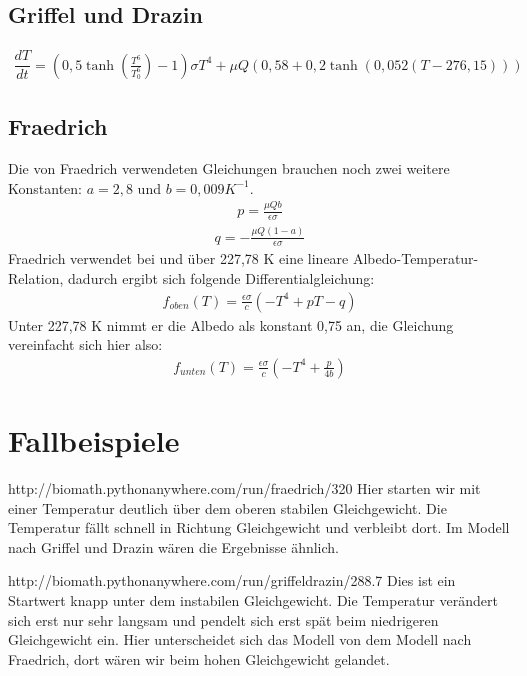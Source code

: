\documentclass[]{report}
\begin{document}
\section{Griffel und Drazin}
	\begin{align}
		\dfrac{dT}{dt} = (0,5 \tanh\left(\frac{T^6}{T_0^6}\right)-1) \sigma T^4 + \mu Q (0,58 + 0,2 \tanh (0,052 (T - 276,15)))
	\end{align}
\section{Fraedrich}

Die von Fraedrich verwendeten Gleichungen brauchen noch zwei weitere Konstanten: $a=2,8$ und $b=0,009 K^{-1}$.
	\begin{align}
		p=\frac{\mu Q b}{\epsilon \sigma}
	\end{align}
	\begin{align}
		q = - \frac{\mu Q (1-a)}{\epsilon \sigma}
	\end{align}
	Fraedrich verwendet bei und über 227,78 K eine lineare Albedo-Temperatur-Relation, dadurch ergibt sich folgende Differentialgleichung:
	\begin{align}
		f_{oben}(T) = \frac{\epsilon \sigma}{c} (-T^4 + p T - q)
	\end{align}
	Unter 227,78 K nimmt er die Albedo als konstant 0,75 an, die Gleichung vereinfacht sich hier also:
	\begin{align}
		f_{unten}(T) = \frac{\epsilon \sigma}{c} (-T^4 + \frac{p}{4b})
	\end{align}
	

\chapter{Fallbeispiele}

http://biomath.pythonanywhere.com/run/fraedrich/320
Hier starten wir mit einer Temperatur deutlich über dem oberen stabilen Gleichgewicht. Die Temperatur fällt schnell in Richtung Gleichgewicht und verbleibt dort. Im Modell nach Griffel und Drazin wären die Ergebnisse ähnlich.

http://biomath.pythonanywhere.com/run/griffeldrazin/288.7
Dies ist ein Startwert knapp unter dem instabilen Gleichgewicht. Die Temperatur verändert sich erst nur sehr langsam und pendelt sich erst spät beim niedrigeren Gleichgewicht ein. Hier unterscheidet sich das Modell von dem Modell nach Fraedrich, dort wären wir beim hohen Gleichgewicht gelandet.
\end{document}
